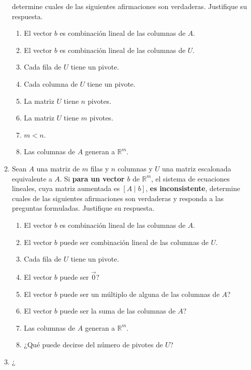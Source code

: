 \documentclass{article}
\begin{document}
\begin{enumerate}
        determine cuales de las siguientes afirmaciones son verdaderas. Justifique su respuesta.
        \begin{enumerate}[label=\listAlph]
            \item El vector \(b\) es combinación lineal de las columnas de \(A\).
            \item El vector \(b\) es combinación lineal de las columnas de \(U\).
            \item Cada fila de \(U\) tiene un pivote.
            \item Cada columna de \(U\) tiene un pivote.
            \item La matriz \(U\) tiene \(n\) pivotes.
            \item La matriz \(U\) tiene \(m\) pivotes.
            \item \(m < n\).
            \item Las columnas de \(A\) generan a \(\mathbb{R}^m\).
        \end{enumerate}
    \item Sean \(A\) una matriz de \(m\) filas y \(n\) columnas y \(U\) una matriz escalonada equivalente a \(A\). 
        Si \textbf{para un vector \(b\)} de \(\mathbb{R}^m\),
        el sistema de ecuaciones lineales, cuya matriz aumentada es \(\left[A \mid b\right]\),
        \textbf{es inconsistente}, 
        determine cuales de las siguientes afirmaciones son verdaderas y responda a las preguntas formuladas. 
        Justifique su respuesta.
        \begin{enumerate}[label=\listAlph]
            \item El vector \(b\) es combinación lineal de las columnas de \(A\).
            \item El vector \(b\) puede ser combinación lineal de las columnas de \(U\).
            \item Cada fila de \(U\) tiene un pivote.
            \item El vector \(b\) puede ser \(\vec{0}\)?
            \item El vector \(b\) puede ser un múltiplo de alguna de las columnas de \(A\)?
            \item El vector \(b\) puede ser la suma de las columnas de \(A\)?
            \item Las columnas de \(A\) generan a \(\mathbb{R}^m\).
            \item ¿Qué puede decirse del número de pivotes de \(U\)?
        \end{enumerate}
    \item ¿%

\end{enumerate}
\end{document}
